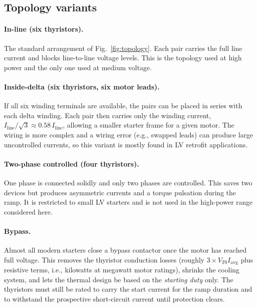 \documentclass[11pt,a4paper]{article}
\begin{document}
\subsection{Topology variants}

\paragraph{In-line (six thyristors).} The standard arrangement of
Fig.~\ref{fig:topology}. Each pair carries the full line current and blocks
line-to-line voltage levels. This is the topology used at high power and the
only one used at medium voltage.

\paragraph{Inside-delta (six thyristors, six motor leads).} If all six
winding terminals are available, the pairs can be placed in series with each
delta winding. Each pair then carries only the winding current,
$I_\mathrm{line}/\sqrt{3} \approx 0.58\,I_\mathrm{line}$, allowing a smaller
starter frame for a given motor. The wiring is more complex and a wiring
error (e.g., swapped leads) can produce large uncontrolled currents, so this
variant is mostly found in LV retrofit applications.

\paragraph{Two-phase controlled (four thyristors).} One phase is connected
solidly and only two phases are controlled. This saves two devices but
produces asymmetric currents and a torque pulsation during the ramp. It is
restricted to small LV starters and is not used in the high-power range
considered here.

\paragraph{Bypass.} Almost all modern starters close a bypass contactor once
the motor has reached full voltage. This removes the thyristor conduction
losses (roughly $3 \times V_{T0} I_\mathrm{avg}$ plus resistive terms, i.e.,
kilowatts at megawatt motor ratings), shrinks the cooling system, and lets
the thermal design be based on the \emph{starting duty} only. The thyristors
must still be rated to carry the start current for the ramp duration and to
withstand the prospective short-circuit current until protection clears.
\end{document}

